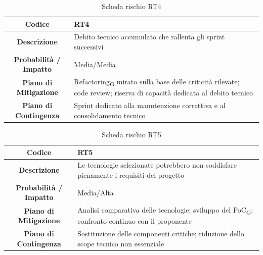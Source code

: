 \begin{table}[H]
	\centering
	\renewcommand{\arraystretch}{1.3}
	\begin{tabularx}{\textwidth}{|c|X|}
		\hline
		\textbf{Codice} & \textbf{RT4} \\
		\hline
		\textbf{Descrizione} & Debito tecnico accumulato che rallenta gli sprint successivi \\
		\hline
		\textbf{Probabilità / Impatto} & Media/Media \\
		\hline
		\textbf{Piano di Mitigazione} & Refactoring\textsubscript{G} mirato sulla base delle criticità rilevate; code review; riserva di capacità dedicata al debito tecnico \\
		\hline
		\textbf{Piano di Contingenza} & Sprint dedicato alla manutenzione correttiva e al consolidamento tecnico \\
		\hline
	\end{tabularx}
	\caption{Scheda rischio RT4}
\end{table}

\begin{table}[H]
	\centering
	\renewcommand{\arraystretch}{1.3}
	\begin{tabularx}{\textwidth}{|c|X|}
		\hline
		\textbf{Codice} & \textbf{RT5} \\
		\hline
		\textbf{Descrizione} & Le tecnologie selezionate potrebbero non soddisfare pienamente i requisiti del progetto \\
		\hline
		\textbf{Probabilità / Impatto} & Media/Alta \\
		\hline
		\textbf{Piano di Mitigazione} & Analisi comparativa delle tecnologie; sviluppo del PoC\textsubscript{G}; confronto continuo con il proponente \\
		\hline
		\textbf{Piano di Contingenza} & Sostituzione delle componenti critiche; riduzione dello scope tecnico non essenziale \\
		\hline
	\end{tabularx}
	\caption{Scheda rischio RT5}
\end{table}


